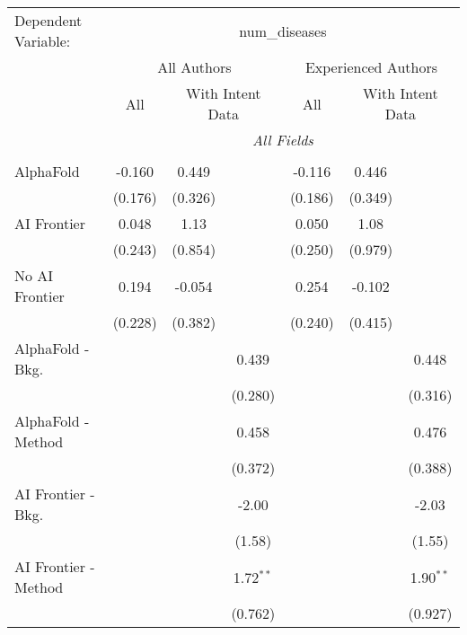 \begingroup
\centering
\begin{tabular}{lcccccc}
   \tabularnewline \midrule \midrule
   Dependent Variable: & \multicolumn{6}{c}{num\_diseases}\\
 & \multicolumn{3}{c}{All Authors} & \multicolumn{3}{c}{Experienced Authors} \\
\cmidrule(lr){2-4} \cmidrule(lr){5-7}
 & \multicolumn{1}{c}{All} & \multicolumn{2}{c}{With Intent Data} & \multicolumn{1}{c}{All} & \multicolumn{2}{c}{With Intent Data} \\
\cmidrule(lr){2-2} \cmidrule(lr){3-4} \cmidrule(lr){5-5} \cmidrule(lr){6-7}
 & \multicolumn{6}{c}{\textit{All Fields}} \\ \\
   AlphaFold               & -0.160  & 0.449   &             & -0.116  & 0.446   &   \\   
                           & (0.176) & (0.326) &             & (0.186) & (0.349) &   \\   
   AI Frontier             & 0.048   & 1.13    &             & 0.050   & 1.08    &   \\   
                           & (0.243) & (0.854) &             & (0.250) & (0.979) &   \\   
   No AI Frontier          & 0.194   & -0.054  &             & 0.254   & -0.102  &   \\   
                           & (0.228) & (0.382) &             & (0.240) & (0.415) &   \\   
   AlphaFold - Bkg.        &         &         & 0.439       &         &         & 0.448\\   
                           &         &         & (0.280)     &         &         & (0.316)\\   
   AlphaFold - Method      &         &         & 0.458       &         &         & 0.476\\   
                           &         &         & (0.372)     &         &         & (0.388)\\   
   AI Frontier - Bkg.      &         &         & -2.00       &         &         & -2.03\\   
                           &         &         & (1.58)      &         &         & (1.55)\\   
   AI Frontier - Method    &         &         & 1.72$^{**}$ &         &         & 1.90$^{**}$\\   
                           &         &         & (0.762)     &         &         & (0.927)\\   

\end{tabular}
